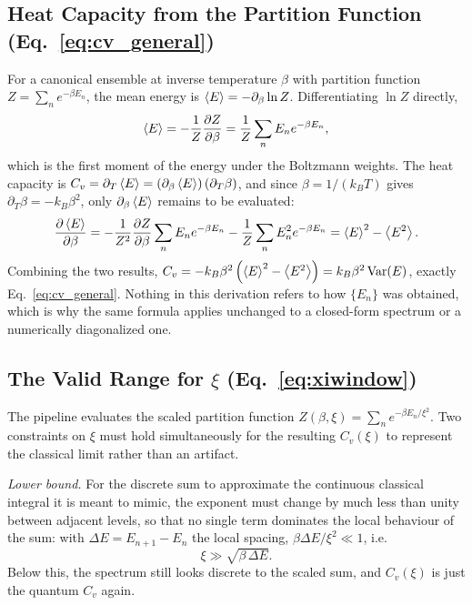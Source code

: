 \documentclass[10pt,conference]{IEEEtran}
\begin{document}
\subsection{Heat Capacity from the Partition Function (Eq.~\ref{eq:cv_general})}
For a canonical ensemble at inverse temperature $\beta$ with partition function $Z=\sum_n e^{-\beta E_n}$, the mean energy is $\expval{E}=-\partial_\beta \ln Z$. Differentiating $\ln Z$ directly,
\begin{equation}
\expval{E} = -\frac{1}{Z}\frac{\partial Z}{\partial\beta} = \frac{1}{Z}\sum_n E_n e^{-\beta E_n},
\end{equation}
which is the first moment of the energy under the Boltzmann weights. The heat capacity is $C_v=\partial_T\expval{E}=\left(\partial_\beta\expval{E}\right)\left(\partial_T\beta\right)$, and since $\beta=1/(k_BT)$ gives $\partial_T\beta=-k_B\beta^2$, only $\partial_\beta\expval{E}$ remains to be evaluated:
\begin{equation}
\frac{\partial\expval{E}}{\partial\beta} = -\frac{1}{Z^2}\frac{\partial Z}{\partial\beta}\sum_n E_ne^{-\beta E_n} - \frac{1}{Z}\sum_n E_n^2 e^{-\beta E_n} = \expval{E}^2-\expval{E^2}.
\end{equation}
Combining the two results, $C_v = -k_B\beta^2\left(\expval{E}^2-\expval{E^2}\right) = k_B\beta^2\,\mathrm{Var}(E)$, exactly Eq.~\eqref{eq:cv_general}. Nothing in this derivation refers to how $\{E_n\}$ was obtained, which is why the same formula applies unchanged to a closed-form spectrum or a numerically diagonalized one.

\subsection{The Valid Range for $\xi$ (Eq.~\ref{eq:xiwindow})}
The pipeline evaluates the scaled partition function $Z(\beta,\xi)=\sum_n e^{-\beta E_n/\xi^2}$. Two constraints on $\xi$ must hold simultaneously for the resulting $C_v(\xi)$ to represent the classical limit rather than an artifact.

\emph{Lower bound.} For the discrete sum to approximate the continuous classical integral it is meant to mimic, the exponent must change by much less than unity between adjacent levels, so that no single term dominates the local behaviour of the sum: with $\Delta E=E_{n+1}-E_n$ the local spacing, $\beta\Delta E/\xi^2\ll1$, i.e.
\begin{equation}
\xi \gg \sqrt{\beta\,\Delta E}.
\end{equation}
Below this, the spectrum still looks discrete to the scaled sum, and $C_v(\xi)$ is just the quantum $C_v$ again.
\end{document}
